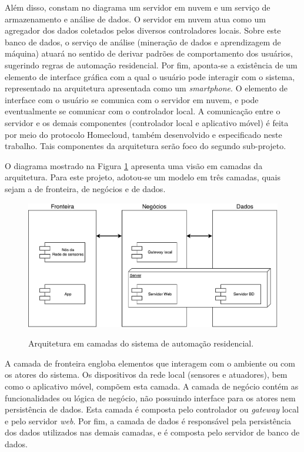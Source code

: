 Além disso, constam no diagrama um servidor em nuvem e um serviço de armazenamento e análise de dados. O servidor em nuvem atua como um agregador dos dados coletados pelos diversos controladores locais. Sobre este banco de dados, o serviço de análise (mineração de dados e aprendizagem de máquina) atuará no sentido de derivar padrões de comportamento dos usuários, sugerindo regras de automação residencial. Por fim, aponta-se a existência de um elemento de interface gráfica com a qual o usuário pode interagir com o sistema, representado na arquitetura apresentada como um \textit{smartphone}. O elemento de interface com o usuário se comunica com o servidor em nuvem, e pode eventualmente se comunicar com o controlador local. A comunicação entre o servidor e os demais componentes (controlador local e aplicativo móvel) é feita por meio do protocolo Homecloud, também desenvolvido e especificado neste trabalho. Tais componentes da arquitetura serão foco do segundo sub-projeto.

O diagrama mostrado na Figura \ref{fig:arquitetura_uml} apresenta uma visão em camadas da arquitetura. Para este projeto, adotou-se um modelo em três camadas, quais sejam a de fronteira, de negócios e de dados. 

\begin{figure}[h]
	\centering
	\caption{Arquitetura em camadas do sistema de automação residencial.}
  \includegraphics[width=\textwidth]{imagens/arquitetura_uml.pdf}
  \label{fig:arquitetura_uml}  
\end{figure}

A camada de fronteira engloba elementos que interagem com o ambiente ou com os atores do sistema. Os dispositivos da rede local (sensores e atuadores), bem como o aplicativo móvel, compõem esta camada. A camada de negócio contém as funcionalidades ou lógica de negócio, não possuindo interface para os atores nem persistência de dados. Esta camada é composta pelo controlador ou \textit{gateway} local e pelo servidor \textit{web}. Por fim, a camada de dados é responsável pela persistência dos dados utilizados nas demais camadas, e é composta pelo servidor de banco de dados.

